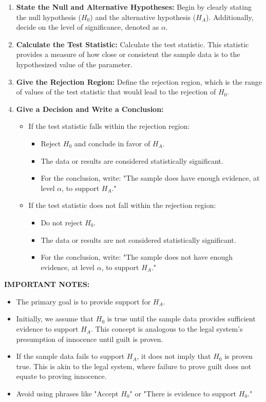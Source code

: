 \documentclass{report}
\begin{document}
\begin{enumerate}
  \item \textbf{State the Null and Alternative Hypotheses:} Begin by clearly stating the null hypothesis ($H_0$) and the alternative hypothesis ($H_A$). Additionally, decide on the level of significance, denoted as $\alpha$.

  \item \textbf{Calculate the Test Statistic:} Calculate the test statistic. This statistic provides a measure of how close or consistent the sample data is to the hypothesized value of the parameter.

  \item \textbf{Give the Rejection Region:} Define the rejection region, which is the range of values of the test statistic that would lead to the rejection of $H_0$.

  \item \textbf{Give a Decision and Write a Conclusion:}
    \begin{itemize}
      \item If the test statistic falls within the rejection region:
        \begin{itemize}
          \item Reject $H_0$ and conclude in favor of $H_A$.
          \item The data or results are considered statistically significant.
          \item For the conclusion, write: "The sample does have enough evidence, at level $\alpha$, to support $H_A$."
        \end{itemize}
      \item If the test statistic does not fall within the rejection region:
        \begin{itemize}
          \item Do not reject $H_0$.
          \item The data or results are not considered statistically significant.
          \item For the conclusion, write: "The sample does not have enough evidence, at level $\alpha$, to support $H_A$."
        \end{itemize}
    \end{itemize}
\end{enumerate}

\textbf{IMPORTANT NOTES:}
\begin{itemize}
  \item The primary goal is to provide support for $H_A$.
  \item Initially, we assume that $H_0$ is true until the sample data provides sufficient evidence to support $H_A$. This concept is analogous to the legal system's presumption of innocence until guilt is proven.
  \item If the sample data fails to support $H_A$, it does not imply that $H_0$ is proven true. This is akin to the legal system, where failure to prove guilt does not equate to proving innocence.
  \item Avoid using phrases like "Accept $H_0$" or "There is evidence to support $H_0$."
\end{itemize}
\pagebreak
\end{document}
